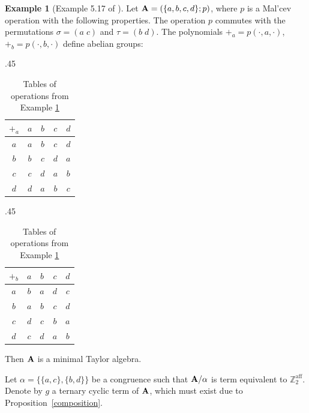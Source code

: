 \documentclass[11pt]{amsart}
\newcommand{\m}[1]{\mathbf{\uppercase{#1}}}
\theoremstyle{definition}
\newtheorem{exmp}{Example}[section]
\theoremstyle{remark}
\theoremstyle{plain}
\begin{document}
\begin{exmp}[Example 5.17 of \cite{dreamteam}]\label{example5.17}
   Let $\m A = (\{a, b, c, d\}; p)$, where $p$ is a Mal’cev operation with the following properties. The operation $p$ commutes with the permutations $\sigma = (a\; c)$ and $\tau = (b\; d)$. The polynomials
$+_a = p(\cdot, a, \cdot)$, $+_b = p(\cdot, b, \cdot)$ define abelian groups:
\begin{table}[h!]
\begin{subtable}{.45\linewidth}
\centering
 \begin{tabular}{c|c c c c}

    $+_a$ & $a$ & $b$& $c$  & $d$\\
\hline

    $a$ & $a$ & $b$ & $c$ & $d$  \\

	$b$ & $b$ & $c$ & $d$ & $a$ \\
	
	$c$ & $c$ & $d$ & $a$ & $b$\\
	
	$d$ & $d$ & $a$ & $b$ & $c$\\
	

\end{tabular}  

\end{subtable}
\begin{subtable}{.45\linewidth}
\centering
 \begin{tabular}{c|c c c c}

    $+_b$ & $a$ & $b$& $c$  & $d$\\
\hline

    $a$ & $b$ & $a$ & $d$ & $c$  \\

	$b$ & $a$ & $b$ & $c$ & $d$ \\
	
	$c$ & $d$ & $c$ & $b$ & $a$\\
	
	$d$ & $c$ & $d$ & $a$ & $b$\\
	

\end{tabular}  

\end{subtable}
\caption{Tables of operations from Example \ref{example5.17}}
\end{table}

Then $\m a$ is a minimal Taylor algebra.
\end{exmp}

Let $\alpha=\{\{a,c\},\{b,d\}\}$ be a congruence such that $\m a/\alpha$ is term equivalent to $\mathbb{Z}_2^\mathrm{aff}$. Denote by $g$ a ternary cyclic term of $\m a$, which must exist due to Proposition~\ref{composition}.
\end{document}
